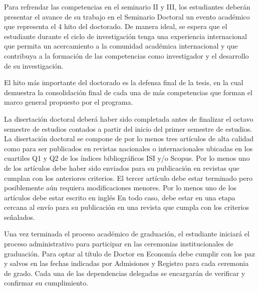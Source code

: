 Para refrendar las competencias en el seminario II y III, los estudiantes deberán presentar el avance de su trabajo en el Seminario Doctoral un evento académico que representa el 4 hito del doctorado. De manera ideal, se espera que el estudiante durante el ciclo de investigación tenga una experiencia internacional que permita un acercamiento a la comunidad académica internacional y que contribuya a la formación de las competencias como investigador y el desarrollo de su investigación.

El hito más importante del doctorado es la defensa final de la tesis, en la cual demuestra la consolidación final de cada una de más competencias que forman el marco general propuesto por el programa.

La disertación doctoral deberá haber sido completada antes de finalizar el octavo semestre de estudios contados a partir del inicio del primer semestre de estudios. La disertación doctoral se compone de por lo menos tres artículos de alta calidad como para ser publicados en revistas nacionales o internacionales ubicadas en los cuartiles Q1 y Q2 de los índices bibliográficos ISI y/o Scopus. Por lo menos uno de los artículos debe haber sido enviados para su publicación en revistas que cumplan con los anteriores criterios. El tercer artículo debe estar terminado pero posiblemente aún requiera modificaciones menores. Por lo menos uno de los artículos debe estar escrito en inglés En todo caso, debe estar en una etapa cercana al envío para su publicación en una revista que cumpla con los criterios señalados. 

Una vez terminada el proceso académico de graduación, el estudiante iniciará el proceso administrativo para participar en las ceremonias institucionales de graduación.  Para optar al título de Doctor en Economía debe cumplir con los paz y salvos en las fechas indicadas por Admisiones y Registro para cada ceremonia de grado. Cada una de las dependencias delegadas se encargarán de verificar y confirmar su cumplimiento.